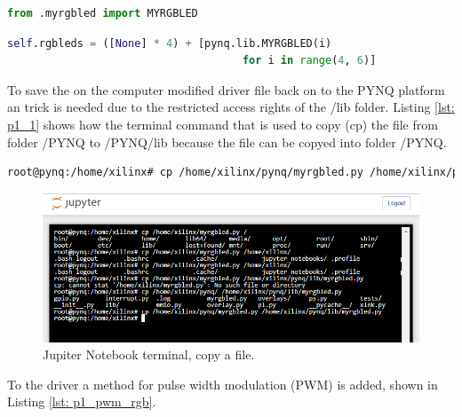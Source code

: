 \begin{lstlisting}[style=PythonStyle, language=Python, caption={Python code changed on line 45 of file \_\_init\_\_.py.},label=lst: p1_2]
from .myrgbled import MYRGBLED
\end{lstlisting}

\begin{lstlisting}[style=PythonStyle, language=Python, caption={Python code changed on line 99 of file base.py.},label=lst: p1_3]
self.rgbleds = ([None] * 4) + [pynq.lib.MYRGBLED(i)
                                     for i in range(4, 6)]
\end{lstlisting}

To save the on the computer modified driver file back on to the PYNQ platform an trick is needed due to the restricted access rights of the /lib folder. Listing \ref{lst: p1_1} shows how the terminal command that is used to copy (cp) the file from folder /PYNQ to /PYNQ/lib because the file can be copyed into folder /PYNQ.

\begin{lstlisting}[language=bash, caption={Jupiter Notebook terminal, copy a file.},label=lst: p1_1]
root@pynq:/home/xilinx# cp /home/xilinx/pynq/myrgbled.py /home/xilinx/pynq/lib/myrgbled.py
\end{lstlisting}
\begin{figure}[H]
	\centering
	\includegraphics[width=\textwidth]{01_images/p1_terminal_cp}
	\caption{Jupiter Notebook terminal, copy a file.}
	\label{fig: part1_terminal}
\end{figure}

To the driver a method for pulse width modulation (PWM) is added, shown in Listing \ref{lst: p1_pwm_rgb}.
\begin{lstlisting}[language=python, caption={PWM for RGB LED.},label=lst: p1_pwm_rgb]

\end{lstlisting}

